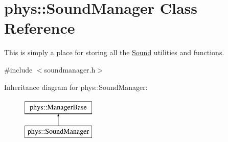 \hypertarget{classphys_1_1SoundManager}{
\section{phys::SoundManager Class Reference}
\label{d1/dc4/classphys_1_1SoundManager}
}


This is simply a place for storing all the \hyperlink{classphys_1_1Sound}{Sound} utilities and functions.  




{\ttfamily \#include $<$soundmanager.h$>$}

Inheritance diagram for phys::SoundManager:\begin{figure}[H]
\begin{center}
\leavevmode
\includegraphics[height=2cm]{d1/dc4/classphys_1_1SoundManager}
\end{center}
\end{figure}
